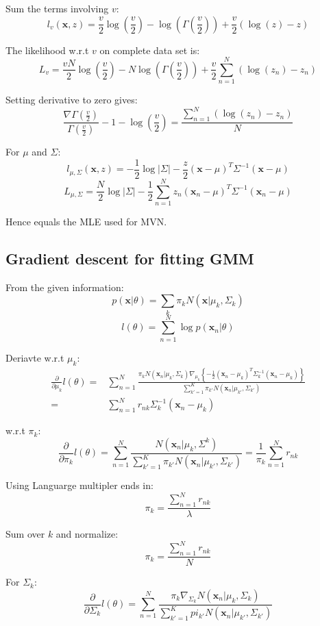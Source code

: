 \documentclass[UTF8]{ctexart}
\begin{document}
Sum the terms involving $v$:
$$l_{v}(\textbf{x},z)=\frac{v}{2}\log(\frac{v}{2})-\log(\Gamma(\frac{v}{2}))+\frac{v}{2}(\log(z)-z)$$

The likelihood w.r.t $v$ on complete data set is:
$$L_{v}=\frac{vN}{2}\log(\frac{v}{2})-N\log(\Gamma(\frac{v}{2}))+\frac{v}{2}\sum_{n=1}^{N}(\log(z_{n})-z_{n})$$

Setting derivative to zero gives:
$$\frac{\nabla\Gamma(\frac{v}{2})}{\Gamma(\frac{v}{2})}-1-\log(\frac{v}{2})=\frac{\sum_{n=1}^{N}(\log(z_{n})-z_{n})}{N}$$

For $\mu$ and $\Sigma$:
$$l_{\mu,\Sigma}(\textbf{x},z)=-\frac{1}{2}\log|\Sigma|-\frac{z}{2}(\textbf{x}-\mu)^{T}\Sigma^{-1}(\textbf{x}-\mu)$$
$$L_{\mu,\Sigma}=\frac{N}{2}\log|\Sigma|-\frac{1}{2}\sum_{n=1}^{N}z_{n}(\textbf{x}_{n}-\mu)^{T}\Sigma^{-1}(\textbf{x}_{n}-\mu)$$

Hence equals the MLE used for MVN.

\subsection{Gradient descent for fitting GMM}
From the given information:
$$p(\textbf{x}|\theta)=\sum_{k}\pi_{k}N(\textbf{x}|\mu_{k},\Sigma_{k})$$
$$l(\theta)=\sum_{n=1}^{N}\log p(\textbf{x}_{n}|\theta)$$

Deriavte w.r.t $\mu_{k}$:
\begin{align}
\frac{\partial}{\partial \mu_{k}}l(\theta) =& \sum_{n=1}^{N}\frac{\pi_{k}N(\textbf{x}_{n}|\mu_{k},\Sigma_{k})\nabla_{\mu_{k}}\left\{-\frac{1}{2}(\textbf{x}_{n}-\mu_{k})^{T}\Sigma_{k}^{-1}(\textbf{x}_{n}-\mu_{k})  \right\}}{\sum_{k'=1}^{K}\pi_{k'}N(\textbf{x}_{n}|\mu_{k'},\Sigma_{k'})}\nonumber \\
=&\sum_{n=1}^{N}r_{nk}\Sigma_{k}^{-1}(\textbf{x}_{n}-\mu_{k})\nonumber
\end{align}

w.r.t $\pi_{k}$:
$$\frac{\partial}{\partial \pi_{k}}l(\theta)=\sum_{n=1}^{N}\frac{N(\textbf{x}_{n}|\mu_{k},\Sigma^{k})}{\sum_{k'=1}^{K}\pi_{k'}N(\textbf{x}_{n}|\mu_{k'},\Sigma_{k'})}=\frac{1}{\pi_{k}}\sum_{n=1}^{N}r_{nk}$$

Using Languarge multipler ends in:
$$\pi_{k}=\frac{\sum_{n=1}^{N}r_{nk}}{\lambda}$$

Sum over $k$ and normalize:
$$\pi_{k}=\frac{\sum_{n=1}^{N}r_{nk}}{N}$$

For $\Sigma_{k}$:
$$\frac{\partial}{\partial \Sigma_{k}}l(\theta)=\sum_{n=1}^{N}\frac{\pi_{k}\nabla_{\Sigma_{k}}N(\textbf{x}_{n}|\mu_{k},\Sigma_{k})}{\sum_{k'=1}^{K}pi_{k'}N(\textbf{x}_{n}|\mu_{k'},\Sigma_{k'})}$$
\end{document}

